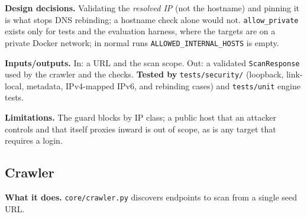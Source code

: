 \begin{center}
\end{center}

\textbf{Design decisions.} Validating the \emph{resolved IP} (not the hostname)
and pinning it is what stops DNS rebinding; a hostname check alone would not.
\texttt{allow\_private} exists only for tests and the evaluation harness, where
the targets are on a private Docker network; in normal runs
\texttt{ALLOWED\_INTERNAL\_HOSTS} is empty.

\textbf{Inputs/outputs.} In: a URL and the scan scope. Out: a validated
\texttt{ScanResponse} used by the crawler and the checks. \textbf{Tested by}
\texttt{tests/security/} (loopback, link-local, metadata, IPv4-mapped IPv6, and
rebinding cases) and \texttt{tests/unit} engine tests.

\textbf{Limitations.} The guard blocks by IP class; a public host that an
attacker controls and that itself proxies inward is out of scope, as is any
target that requires a login.

\subsection{Crawler}
\textbf{What it does.} \texttt{core/crawler.py} discovers endpoints to scan from
a single seed URL.

